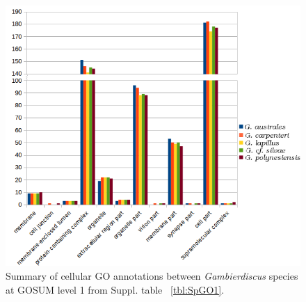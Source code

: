 \documentclass[12pt]{article}
\begin{document}
\begin{figure} 
\includegraphics[scale=.9]{3Aug18_cluster-investigation/figures/gosum-species/Species-gosum1-cell-split.png} 
\caption{Summary of cellular GO annotations between \textit{Gambierdiscus} species at GOSUM level 1 from Suppl. table ~\ref{tbl:SpGO1}.} 
\label{fig:SpecGo1Cell}
\end{figure} 
\FloatBarrier
\end{document}
